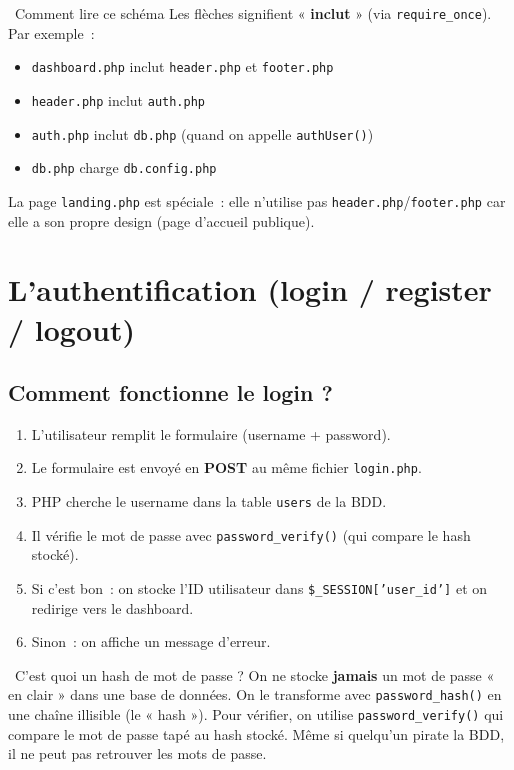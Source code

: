 \documentclass[12pt,a4paper]{article}
\begin{document}
\begin{tipbox}{\faProjectDiagram\ Comment lire ce schéma}
Les flèches signifient « \textbf{inclut} » (via \texttt{require\_once}). Par exemple~:
\begin{itemize}
    \item \texttt{dashboard.php} inclut \texttt{header.php} et \texttt{footer.php}
    \item \texttt{header.php} inclut \texttt{auth.php}
    \item \texttt{auth.php} inclut \texttt{db.php} (quand on appelle \texttt{authUser()})
    \item \texttt{db.php} charge \texttt{db.config.php}
\end{itemize}
La page \texttt{landing.php} est spéciale~: elle n'utilise pas \texttt{header.php}/\texttt{footer.php} car elle a son propre design (page d'accueil publique).
\end{tipbox}

\section{L'authentification (login / register / logout)}

\subsection{Comment fonctionne le login ?}

\begin{enumerate}
    \item L'utilisateur remplit le formulaire (username + password).
    \item Le formulaire est envoyé en \textbf{POST} au même fichier \texttt{login.php}.
    \item PHP cherche le username dans la table \texttt{users} de la BDD.
    \item Il vérifie le mot de passe avec \texttt{password\_verify()} (qui compare le hash stocké).
    \item Si c'est bon~: on stocke l'ID utilisateur dans \texttt{\$\_SESSION['user\_id']} et on redirige vers le dashboard.
    \item Sinon~: on affiche un message d'erreur.
\end{enumerate}

\begin{conceptbox}{\faLock\ C'est quoi un hash de mot de passe ?}
On ne stocke \textbf{jamais} un mot de passe « en clair » dans une base de données. On le transforme avec \texttt{password\_hash()} en une chaîne illisible (le « hash »). Pour vérifier, on utilise \texttt{password\_verify()} qui compare le mot de passe tapé au hash stocké. Même si quelqu'un pirate la BDD, il ne peut pas retrouver les mots de passe.
\end{conceptbox}
\end{document}
